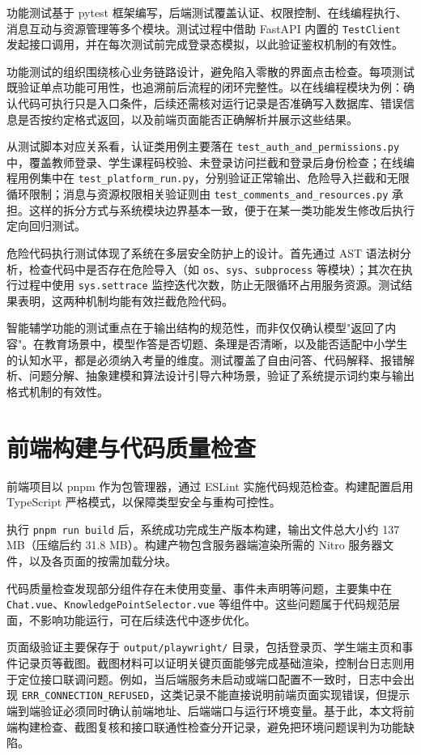 功能测试基于 pytest 框架编写，后端测试覆盖认证、权限控制、在线编程执行、消息互动与资源管理等多个模块。测试过程中借助 FastAPI 内置的 \texttt{TestClient} 发起接口调用，并在每次测试前完成登录态模拟，以此验证鉴权机制的有效性。

功能测试的组织围绕核心业务链路设计，避免陷入零散的界面点击检查。每项测试既验证单点功能可用性，也追溯前后流程的闭环完整性。以在线编程模块为例：确认代码可执行只是入口条件，后续还需核对运行记录是否准确写入数据库、错误信息是否按约定格式返回，以及前端页面能否正确解析并展示这些结果。

从测试脚本对应关系看，认证类用例主要落在 \texttt{test\_auth\_and\_permissions.py} 中，覆盖教师登录、学生课程码校验、未登录访问拦截和登录后身份检查；在线编程用例集中在 \texttt{test\_platform\_run.py}，分别验证正常输出、危险导入拦截和无限循环限制；消息与资源权限相关验证则由 \texttt{test\_comments\_and\_resources.py} 承担。这样的拆分方式与系统模块边界基本一致，便于在某一类功能发生修改后执行定向回归测试。

危险代码执行测试体现了系统在多层安全防护上的设计。首先通过 AST 语法树分析，检查代码中是否存在危险导入（如 \texttt{os}、\texttt{sys}、\texttt{subprocess} 等模块）；其次在执行过程中使用 \texttt{sys.settrace} 监控迭代次数，防止无限循环占用服务资源。测试结果表明，这两种机制均能有效拦截危险代码。

智能辅学功能的测试重点在于输出结构的规范性，而非仅仅确认模型"返回了内容"。在教育场景中，模型作答是否切题、条理是否清晰，以及能否适配中小学生的认知水平，都是必须纳入考量的维度。测试覆盖了自由问答、代码解释、报错解析、问题分解、抽象建模和算法设计引导六种场景，验证了系统提示词约束与输出格式机制的有效性。

\section{前端构建与代码质量检查}
前端项目以 pnpm 作为包管理器，通过 ESLint 实施代码规范检查。构建配置启用 TypeScript 严格模式，以保障类型安全与重构可控性。

执行 \texttt{pnpm run build} 后，系统成功完成生产版本构建，输出文件总大小约 137 MB（压缩后约 31.8 MB）。构建产物包含服务器端渲染所需的 Nitro 服务器文件，以及各页面的按需加载分块。

代码质量检查发现部分组件存在未使用变量、事件未声明等问题，主要集中在 \texttt{Chat.vue}、\texttt{KnowledgePointSelector.vue} 等组件中。这些问题属于代码规范层面，不影响功能运行，可在后续迭代中逐步优化。

页面级验证主要保存于 \texttt{output/playwright/} 目录，包括登录页、学生端主页和事件记录页等截图。截图材料可以证明关键页面能够完成基础渲染，控制台日志则用于定位接口联调问题。例如，当后端服务未启动或端口配置不一致时，日志中会出现 \texttt{ERR\_CONNECTION\_REFUSED}，这类记录不能直接说明前端页面实现错误，但提示端到端验证必须同时确认前端地址、后端端口与运行环境变量。基于此，本文将前端构建检查、截图复核和接口联通性检查分开记录，避免把环境问题误判为功能缺陷。

